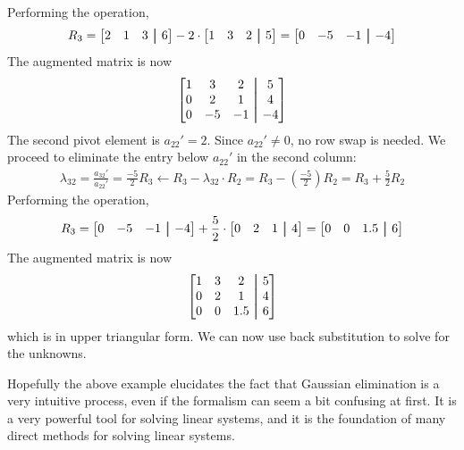 \begin{exampleBox}
    Performing the operation,
    \begin{equation*}
        R_3 = \begin{bmatrix} 2 & 1 & 3 &\aug& 6 \end{bmatrix} - 2 \cdot \begin{bmatrix} 1 & 3 & 2 &\aug& 5 \end{bmatrix} = \begin{bmatrix} 0 & -5 & -1 &\aug& -4 \end{bmatrix}
    \end{equation*}
    The augmented matrix is now
    \begin{equation*}
        \begin{bmatrix}
            1 & 3 & 2 &\aug& 5 \\
            0 & 2 & 1 &\aug& 4 \\
            0 & -5 & -1 &\aug& -4
        \end{bmatrix}
    \end{equation*}
    The second pivot element is $ a_{22}' = 2 $. Since $ a_{22}' \neq 0 $, no row swap is needed. We proceed to eliminate the entry below $ a_{22}' $ in the second column:
    \begin{gather*}
        \lambda_{32} = \frac{a_{32}'}{a_{22}'} = \frac{-5}{2}
        R_3 \leftarrow R_3 - \lambda_{32} \cdot R_2 = R_3 - \left( \frac{-5}{2} \right) R_2 = R_3 + \frac{5}{2} R_2
    \end{gather*}
    Performing the operation,
    \begin{equation*}
        R_3 = \begin{bmatrix} 0 & -5 & -1 &\aug& -4 \end{bmatrix} + \frac{5}{2} \cdot \begin{bmatrix} 0 & 2 & 1 &\aug& 4 \end{bmatrix} = \begin{bmatrix} 0 & 0 & 1.5 &\aug& 6 \end{bmatrix}
    \end{equation*}
    The augmented matrix is now
    \begin{equation*}
        \begin{bmatrix}
            1 & 3 & 2 &\aug& 5 \\
            0 & 2 & 1 &\aug& 4 \\
            0 & 0 & 1.5 &\aug& 6
        \end{bmatrix}
    \end{equation*}
    which is in upper triangular form. We can now use back substitution to solve for the unknowns.
\end{exampleBox}
Hopefully the above example elucidates the fact that Gaussian elimination is a very intuitive process, even if the formalism can seem a bit confusing at first. It is a very powerful tool for solving linear systems, and it is the foundation of many direct methods for solving linear systems.

